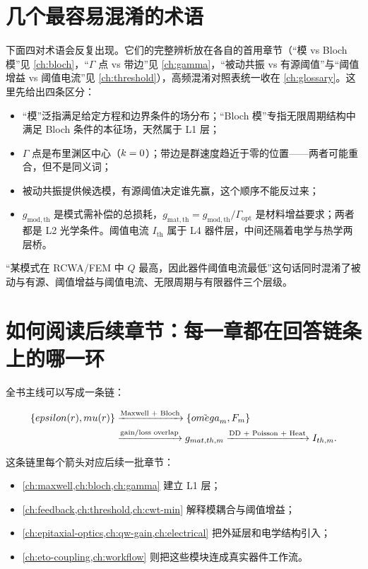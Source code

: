 \section{几个最容易混淆的术语}
下面四对术语会反复出现。它们的完整辨析放在各自的首用章节（“模 vs Bloch 模”见 \cref{ch:bloch}，“$\Gamma$ 点 vs 带边”见 \cref{ch:gamma}，“被动共振 vs 有源阈值”与“阈值增益 vs 阈值电流”见 \cref{ch:threshold}），高频混淆对照表统一收在 \cref{ch:glossary}。这里先给出四条区分：
\begin{itemize}
  \item “模”泛指满足给定方程和边界条件的场分布；“Bloch 模”专指无限周期结构中满足 Bloch 条件的本征场，天然属于 L1 层；
  \item $\Gamma$ 点是布里渊区中心（$k=0$）；带边是群速度趋近于零的位置——两者可能重合，但不是同义词；
  \item 被动共振提供候选模，有源阈值决定谁先赢，这个顺序不能反过来；
  \item $g_\mathrm{mod,th}$ 是模式需补偿的总损耗，$g_\mathrm{mat,th}=g_\mathrm{mod,th}/\Gamma_\mathrm{opt}$ 是材料增益要求；两者都是 L2 光学条件。阈值电流 $I_\mathrm{th}$ 属于 L4 器件层，中间还隔着电学与热学两层桥。
\end{itemize}

\begin{PitfallBox}
“某模式在 RCWA/FEM 中 $Q$ 最高，因此器件阈值电流最低”这句话同时混淆了被动与有源、阈值增益与阈值电流、无限周期与有限器件三个层级。
\end{PitfallBox}

\section{如何阅读后续章节：每一章都在回答链条上的哪一环}
全书主线可以写成一条链：

\begin{equation}
\begin{aligned}
\{epsilon(r),mu(r)\}
&\xrightarrow{\text{Maxwell + Bloch}}
\{\tilde{omega}_m,F_m\}
\\
&\xrightarrow{\text{gain/loss overlap}}
g_{mat,th,m}
\xrightarrow{\text{DD + Poisson + Heat}}
I_{th,m}.
\end{aligned}
\label{eq:book_chain}
\end{equation}

这条链里每个箭头对应后续一批章节：
\begin{itemize}
  \item \cref{ch:maxwell,ch:bloch,ch:gamma} 建立 L1 层；
  \item \cref{ch:feedback,ch:threshold,ch:cwt-min} 解释模耦合与阈值增益；
  \item \cref{ch:epitaxial-optics,ch:qw-gain,ch:electrical} 把外延层和电学结构引入；
  \item \cref{ch:eto-coupling,ch:workflow} 则把这些模块连成真实器件工作流。
\end{itemize}

